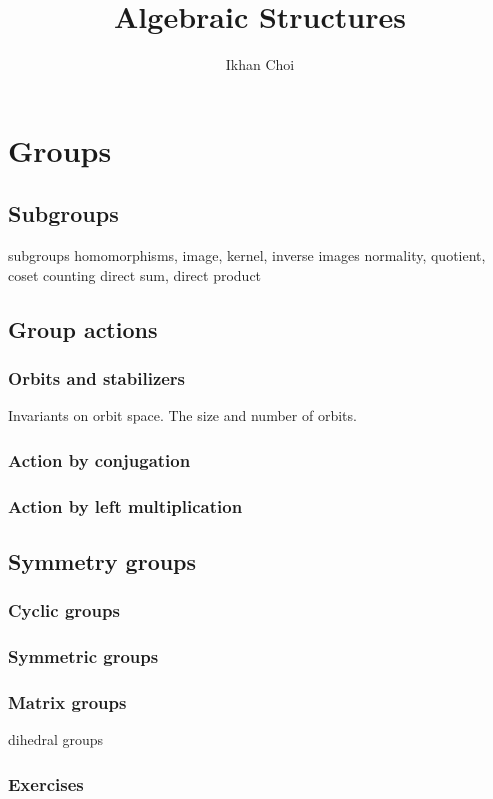 \documentclass{../note}
\begin{document}
\title{Algebraic Structures}
\author{Ikhan Choi}
\maketitle
\tableofcontents

\part{Groups}
\chapter{Subgroups}
subgroups
homomorphisms, image, kernel, inverse images
normality, quotient, coset counting
direct sum, direct product

\chapter{Group actions}
\section{Orbits and stabilizers}
Invariants on orbit space.
The size and number of orbits.

\section{Action by conjugation}
\section{Action by left multiplication}


\chapter{Symmetry groups}
\section{Cyclic groups}
\section{Symmetric groups}
\section{Matrix groups}
dihedral groups



\section*{Exercises}
\end{document}
